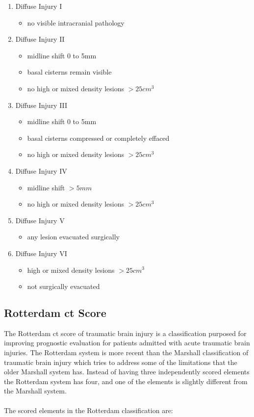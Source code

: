 \documentclass[11pt]{article}
\begin{document}
\begin{enumerate}
\item{Diffuse Injury I}
  \begin{itemize}
    \item{no visible intracranial pathology}
  \end{itemize}
\item{Diffuse Injury II}
  \begin{itemize}
   \item{midline shift 0 to 5mm}
    \item{basal cisterns remain visible}
    \item{no high  or mixed density lesions $>25 cm^3$}
  \end{itemize}
\item{Diffuse Injury III}
  \begin{itemize}
    \item{midline shift 0 to 5mm}
    \item{basal cisterns compressed or completely effaced}
    \item{no high or mixed density lesions $>25cm^3$}
  \end{itemize}
\item{Diffuse Injury IV}
  \begin{itemize}
    \item{midline shift $>5 mm$}
    \item{no high or mixed density lesions $>25cm^3$}
  \end{itemize}
\item{Diffuse Injury V}
  \begin{itemize}
    \item{any lesion evacuated surgically}
  \end{itemize}
\item{Diffuse Injury VI}
  \begin{itemize}
    \item{high or mixed density lesions $>25cm^3$}
    \item{not surgically evacuated}
  \end{itemize}
\end{enumerate}

\subsection{Rotterdam \gls{ct} Score}
The Rotterdam \gls{ct} score of traumatic brain injury is a classification purposed for improving prognostic evaluation for patients admitted with acute traumatic brain injuries. The Rotterdam system is more recent than the Marshall classification of traumatic brain injury which tries to address some of the limitations that the older Marshall system has. Instead of having three independently scored elements the Rotterdam system has four, and one of the elements is slightly different from the Marshall system.\\
\\
The scored elements in the Rotterdam classification are:
\end{document}
